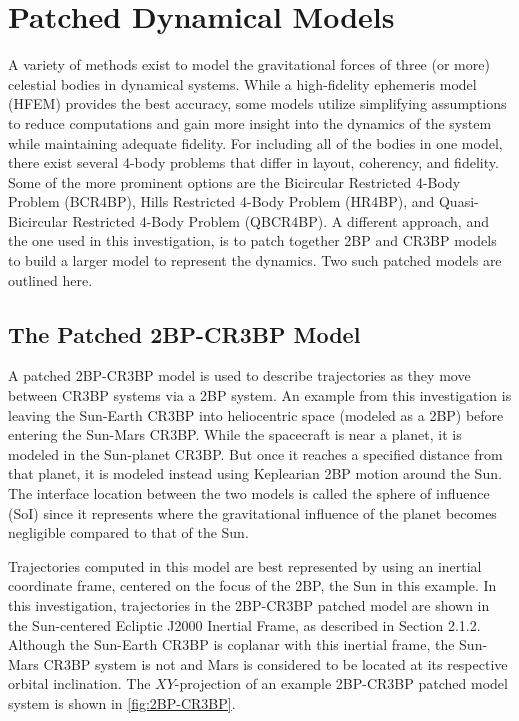 \section{Patched Dynamical Models}
A variety of methods exist to model the gravitational forces of three (or more) celestial bodies in
dynamical systems. While a high-fidelity ephemeris model (HFEM) provides the best accuracy, some
models utilize simplifying assumptions to reduce computations and gain more insight into the
dynamics of the system while maintaining adequate fidelity. For including all of the bodies in one
model, there exist several 4-body problems that differ in layout, coherency, and fidelity. Some of
the more prominent options are the Bicircular Restricted 4-Body Problem (BCR4BP)\cite{Boudad:2018},
Hills Restricted 4-Body Problem (HR4BP)\cite{Scheeres:1998}, and Quasi-Bicircular Restricted 4-Body
Problem (QBCR4BP)\cite{Andreu:2002}. A different approach, and the one used in this investigation,
is to patch together 2BP and CR3BP models to build a larger model to represent the dynamics. Two
such patched models are outlined here.

\subsection{The Patched 2BP-CR3BP Model}
A patched 2BP-CR3BP model is used to describe trajectories as they move between CR3BP systems via a
2BP system. An example from this investigation is leaving the Sun-Earth CR3BP into heliocentric
space (modeled as a 2BP) before entering the Sun-Mars CR3BP. While the spacecraft is near a planet,
it is modeled in the Sun-planet CR3BP. But once it reaches a specified distance from that planet,
it is modeled instead using Keplearian 2BP motion around the Sun\cite{Canales:2021}. The interface
location between the two models is called the sphere of influence (SoI) since it represents where
the gravitational influence of the planet becomes negligible compared to that of the Sun.

Trajectories computed in this model are best represented by using an inertial coordinate frame,
centered on the focus of the 2BP, the Sun in this example. In this investigation, trajectories in
the 2BP-CR3BP patched model are shown in the Sun-centered Ecliptic J2000 Inertial Frame, as
described in Section 2.1.2. Although the Sun-Earth CR3BP is coplanar with this inertial frame, the
Sun-Mars CR3BP system is not and Mars is considered to be located at its respective orbital
inclination. The $XY$-projection of an example 2BP-CR3BP patched model system is shown in
\cref{fig:2BP-CR3BP}.

